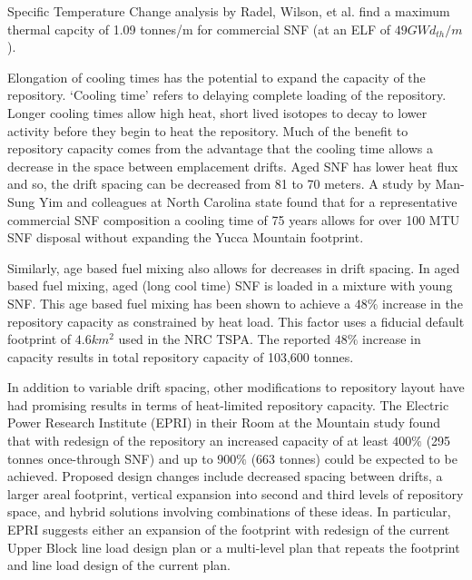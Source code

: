 Specific Temperature Change analysis by Radel, Wilson, et al. find a 
maximum thermal capcity of 1.09 tonnes/m for commercial SNF (at an ELF 
of $49 GWd_{th}/m$).\cite{radel_effect_2007} 

Elongation of cooling times has the potential to expand the capacity 
of the repository. `Cooling time' refers to delaying complete loading 
of the repository. Longer cooling times allow high heat, short lived 
isotopes to decay to lower activity before they begin to heat the 
repository. Much of the benefit to repository capacity comes from the 
advantage that the cooling time allows a decrease in the space between 
emplacement drifts. Aged SNF has lower heat flux and so, the drift 
spacing can be decreased from 81 to 70 meters. A study by Man-Sung Yim 
and colleagues at North Carolina state found that for a representative 
commercial SNF composition a cooling time of 75 years allows for over 
100 MTU SNF disposal without expanding the Yucca Mountain 
footprint.\cite{li_examining_2007}

Similarly, age based fuel mixing also allows for decreases in drift 
spacing. In aged based fuel mixing, aged (long cool time) SNF is 
loaded in a mixture with young SNF. This age based fuel mixing has 
been shown to achieve a $48\%$ increase in the repository capacity as 
constrained by heat load.\cite{nicholson_thermal_2007} This factor 
uses a fiducial default footprint of $4.6 km^2$ used in the NRC TSPA.  
The reported $48\%$ increase in capacity results in total repository 
capacity of 103,600 tonnes.\cite{williams_contract_2001}

In addition to variable drift spacing, other modifications to 
repository layout have had promising results in terms of heat-limited 
repository capacity. The Electric Power Research Institute (EPRI) in 
their Room at the Mountain study found that with redesign of the 
repository an increased capacity of at least $400\%$ (295 tonnes 
once-through SNF) and up to $900\%$ (663 tonnes) could be expected to 
be achieved. Proposed design changes include decreased spacing between 
drifts, a larger areal footprint, vertical expansion into second and 
third levels of repository space, and hybrid solutions involving 
combinations of these ideas. In particular, EPRI suggests either an 
expansion of the footprint with redesign of the current Upper Block 
line load design plan or a multi-level plan that repeats the footprint 
and line load design of the current plan.\cite{kessler_room_2006}


